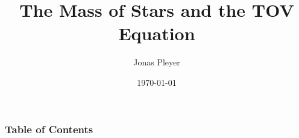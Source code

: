 \documentclass{beamer}
\title[Star Masses and TOV Equation]{The Mass of Stars and the TOV Equation}
\author[Jonas Pleyer]{Jonas Pleyer}
\date{\today}
\begin{document}
\begin{frame}
  \titlepage
\end{frame}

\begin{frame}
    \frametitle{Table of Contents}
	\tableofcontents[hideallsubsections,subsubsectionstyle=hide]
\end{frame}







\end{document}
